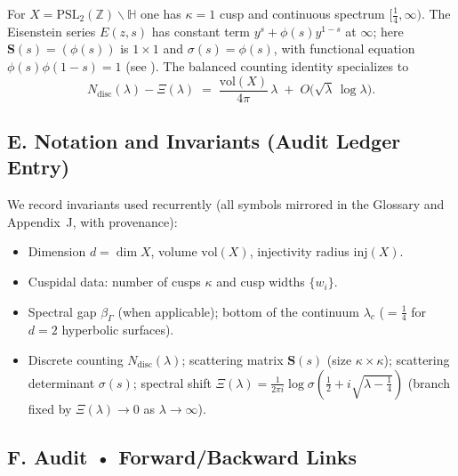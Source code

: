 For $X=\mathrm{PSL}_2(\mathbb{Z})\backslash\mathbb{H}$ one has $\kappa=1$ cusp and continuous spectrum $[\tfrac14,\infty)$. The Eisenstein series $E(z,s)$ has constant term $y^s+\phi(s)y^{1-s}$ at $\infty$; here $\mathbf S(s)=(\phi(s))$ is $1\times 1$ and $\sigma(s)=\phi(s)$, with functional equation $\phi(s)\phi(1-s)=1$ (see \cite{Hejhal1983II}). The balanced counting identity specializes to
\[
  N_{\mathrm{disc}}(\lambda) - \Xi(\lambda)
  \;=\; \frac{\mathrm{vol}(X)}{4\pi}\,\lambda
  \;+\; O\!\big(\sqrt{\lambda}\,\log\lambda\big).
\]


\subsection*{E. Notation and Invariants (Audit Ledger Entry)}
\label{subsec:notation-invariants}

We record invariants used recurrently (all symbols mirrored in the Glossary and Appendix~J, with provenance):
\begin{itemize}
  \item Dimension $d=\dim X$, volume $\mathrm{vol}(X)$, injectivity radius $\mathrm{inj}(X)$.
  \item Cuspidal data: number of cusps $\kappa$ and cusp widths $\{w_i\}$.
  \item Spectral gap $\beta_\Gamma$ (when applicable); bottom of the continuum $\lambda_c$ ($=\tfrac14$ for $d=2$ hyperbolic surfaces).
  \item Discrete counting $N_{\mathrm{disc}}(\lambda)$; scattering matrix $\mathbf S(s)$ (size $\kappa\times\kappa$); scattering determinant $\sigma(s)$; spectral shift $\Xi(\lambda)=\frac{1}{2\pi i}\log \sigma(\tfrac12+i\sqrt{\lambda-\tfrac14})$ (branch fixed by $\Xi(\lambda)\to 0$ as $\lambda\to\infty$).
\end{itemize}


\subsection*{F. Audit • Forward/Backward Links}
\label{subsec:audit-links}

